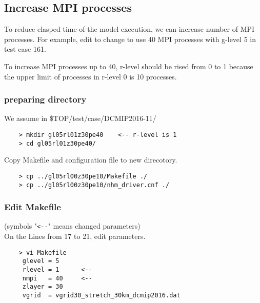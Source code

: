 \subsection{Increase MPI processes}
 \noindent To reduce elasped time of the model execution, we can increase
 number of MPI processes. For example, edit to change to use 40 MPI processes
 with g-level 5 in test case 161.

 To increase MPI processes up to 40, r-level should be rised from 0 to 1
 because the upper limit of processes in r-level 0 is 10 processes.

\subsubsection{preparing directory}
 We assume in \${TOP}/test/case/DCMIP2016-11/
 \begin{verbatim}
    > mkdir gl05rl01z30pe40    <-- r-level is 1
    > cd gl05rl01z30pe40/
 \end{verbatim}

 \noindent Copy Makefile and configuration file to new direcotory.
 \begin{verbatim}
    > cp ../gl05rl00z30pe10/Makefile ./
    > cp ../gl05rl00z30pe10/nhm_driver.cnf ./
 \end{verbatim}

\subsubsection{Edit Makefile}
 (symbols "\verb|<--|" means changed parameters) \\
 On the Lines from 17 to 21, edit parameters.
 \begin{verbatim}
    > vi Makefile
     glevel = 5
     rlevel = 1      <--
     nmpi   = 40     <--
     zlayer = 30
     vgrid  = vgrid30_stretch_30km_dcmip2016.dat
 \end{verbatim}

